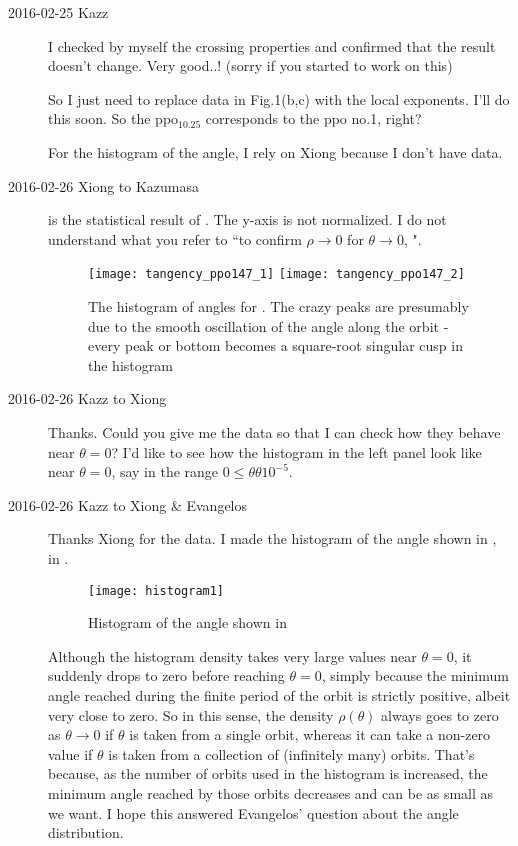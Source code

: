 \begin{description}
\item[2016-02-25 Kazz]
I checked by myself the crossing properties and confirmed that the result doesn't change. Very good..! (sorry if you started to work on this)

So I just need to replace data in Fig.1(b,c) with the local exponents. I'll do this soon. So the ppo$_{10.25}$ corresponds to the ppo no.1, right?

For the histogram of the angle, I rely on Xiong because I don't have data.

\item[2016-02-26 Xiong to Kazumasa]
 is the statistical result of
. The y-axis is not normalized.
I do not understand what you refer to
``to confirm $\rho \to 0$ for $\theta \to 0$, ".
  \begin{figure}[h]
    \centering
    \texttt{[image: tangency\_ppo147\_1]}
    \texttt{[image: tangency\_ppo147\_2]}
    \caption{The histogram of angles for . The
    crazy peaks are presumably due to the smooth oscillation of the angle
    along the orbit - every peak or bottom becomes a square-root singular
    cusp in the histogram}
    \label{fig:tangency_ppo147}
  \end{figure}

\item[2016-02-26 Kazz to Xiong]
Thanks.  Could you give me the data so that I can check how they behave near $\theta=0$? I'd like to see how the histogram in the left panel
 look like near $\theta=0$, say in the range $0 \leq \theta \theta 10^{-5}$.

\item[2016-02-26 Kazz to Xiong \& Evangelos]
Thanks Xiong for the data.
I made the histogram of the angle shown in ,
 in .
  \begin{figure}
    \centering
    \texttt{[image: histogram1]}
    \caption{Histogram of the angle shown in }
    \label{fig:histogram1}
  \end{figure}
Although the histogram density takes very large values near $\theta=0$,
it suddenly drops to zero before reaching $\theta=0$, simply because the
minimum angle reached during the finite period of the orbit is strictly
positive, albeit very close to zero. So in this sense, the density
$\rho(\theta)$ always goes to zero as $\theta \to 0$ if $\theta$ is taken
from a single orbit, whereas it can take a non-zero value if $\theta$ is
taken from a collection of (infinitely many) orbits. That's because, as
the number of orbits used in the histogram is increased, the minimum
angle reached by those orbits decreases and can be as small as we want. I
hope this answered Evangelos' question about the angle distribution.


\end{description}
